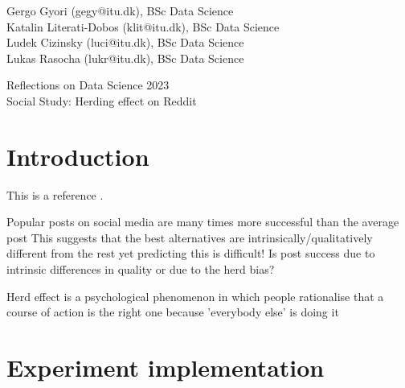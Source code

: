 \documentclass[fleqn,12pt]{article}
\begin{document}
\setlength{\baselineskip}{1.44\baselineskip}



\begin{flushleft}
  {\large Gergo Gyori (gegy@itu.dk), BSc Data Science \\
  Katalin Literati-Dobos (klit@itu.dk), BSc Data Science \\
  Ludek Cizinsky (luci@itu.dk), BSc Data Science \\
  Lukas Rasocha (lukr@itu.dk), BSc Data Science \\}
 \end{flushleft}
 
\begin{center}
  {\Large Reflections on Data Science 2023}\\[5ex]
  {\Large Social Study: Herding effect on Reddit}\\[5ex]

 \end{center}
 




\parindent=20pt 
\parskip=0mm

\section{Introduction}

This is a reference \cite{bergstrom2020calling}.

Popular posts on social media are many times more successful than the average post
 This suggests that the best alternatives are intrinsically/qualitatively different from the
rest  yet predicting this is difficult!
 Is post success due to intrinsic differences in quality or due to the herd bias?

 Herd effect
 is a psychological phenomenon in which
people rationalise that a course of action
is the right one because 'everybody else'
is doing it
\section{Experiment implementation}
\end{document}
